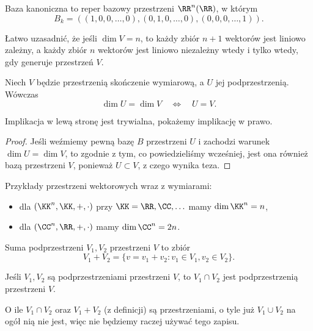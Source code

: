 \begin{definition}
    Baza kanoniczna to reper bazowy przestrzeni $\RR^n(\RR)$, w którym
    \[ B_k = \left((1,0,0,\ldots,0), (0,1,0,\ldots,0), (0,0,0,\ldots,1)\right). \]
\end{definition}

Łatwo uzasadnić, że jeśli $\dim V = n$, to każdy zbiór $n + 1$ wektorów jest liniowo zależny, a każdy zbiór $n$ wektorów jest liniowo niezależny wtedy i tylko wtedy, gdy generuje przestrzeń $V$.

\begin{theorem}
    \label{t:dimU = dimV, U subspace V}
    Niech $V$ będzie przestrzenią skończenie wymiarową, a $U$ jej podprzestrzenią. Wówczas
    \[ \dim U = \dim V \quad\iff\quad U = V. \]
\end{theorem}
Implikacja w lewą stronę jest trywialna, pokażemy implikację w prawo.
\begin{proof}
    Jeśli weźmiemy pewną bazę $B$ przestrzeni $U$ i zachodzi warunek $\dim U = \dim V$, to zgodnie z tym, co powiedzieliśmy wcześniej, jest ona również bazą przestrzeni $V$, ponieważ $U \subset V$, z czego wynika teza.
\end{proof}

\begin{example}
    Przykłady przestrzeni wektorowych wraz z wymiarami:
    \begin{itemize}
        \item dla $(\KK^n, \KK, +, \cdot)$ przy $\KK = \RR, \CC, \ldots$ mamy $\dim \KK^n = n$,
        \item dla $(\CC^n, \RR, +, \cdot)$ mamy $\dim \CC^n = 2n$.
    \end{itemize}
\end{example}

\begin{definition}
    Suma podprzestrzeni $V_1, V_2$ przestrzeni $V$ to zbiór
    \[ V_1 + V_2 = \{v = v_1 + v_2 : v_1 \in V_1, v_2 \in V_2\}. \]
\end{definition}

\begin{fact}
    Jeśli $V_1, V_2$ są podprzestrzeniami przestrzeni $V$, to $V_1 \cap V_2$ jest podprzestrzenią przestrzeni $V$.
\end{fact}

\begin{remark}
    O ile $V_1 \cap V_2$ oraz $V_1 + V_2$ (z definicji) są przestrzeniami, o tyle już $V_1 \cup V_2$ na ogół nią nie jest, więc nie będziemy raczej używać tego zapisu.
\end{remark}

